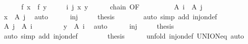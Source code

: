 \begin{isabellebody}
\ \ \ \ \ {\isacharasterisk}{\kern0pt}{\isacharasterisk}{\kern0pt}{\isacharasterisk}{\kern0pt}{\isacharcolon}{\kern0pt}\ {\isachardoublequoteopen}f\ x\ {\isacharequal}{\kern0pt}\ f\ y{\isachardoublequoteclose}\isanewline
\ \ \ \ \ i\ j\ x\ y\isanewline
\ \ \ \ \isamarkupfalse%
\ chain\ {\isacharbrackleft}{\kern0pt}OF\ {\isacharasterisk}{\kern0pt}{\isacharbrackright}{\kern0pt}\isanewline
\ \ \isamarkupfalse%
\isanewline
\ \ \ \ \isamarkupfalse%
\ {\isachardoublequoteopen}A\ i\ {\isasymle}\ A\ j{\isachardoublequoteclose}\isanewline
\ \ \ \ \isamarkupfalse%
\ {\isacharasterisk}{\kern0pt}{\isacharasterisk}{\kern0pt}\ \isamarkupfalse%
\ {\isachardoublequoteopen}x\ {\isasymin}\ A\ j{\isachardoublequoteclose}\ \isamarkupfalse%
\ auto\isanewline
\ \ \ \ \isamarkupfalse%
\ inj\ {\isacharasterisk}{\kern0pt}\ {\isacharasterisk}{\kern0pt}{\isacharasterisk}{\kern0pt}\ {\isacharasterisk}{\kern0pt}{\isacharasterisk}{\kern0pt}{\isacharasterisk}{\kern0pt}\ \isamarkupfalse%
\ {\isacharquery}{\kern0pt}thesis\isanewline
\ \ \ \ \ \ \isamarkupfalse%
\ {\isacharparenleft}{\kern0pt}auto\ simp\ add{\isacharcolon}{\kern0pt}\ inj{\isacharunderscore}{\kern0pt}on{\isacharunderscore}{\kern0pt}def{\isacharparenright}{\kern0pt}\isanewline
\ \ \isamarkupfalse%
\isanewline
\ \ \ \ \isamarkupfalse%
\ {\isachardoublequoteopen}A\ j\ {\isasymle}\ A\ i{\isachardoublequoteclose}\isanewline
\ \ \ \ \isamarkupfalse%
\ {\isacharasterisk}{\kern0pt}{\isacharasterisk}{\kern0pt}\ \isamarkupfalse%
\ {\isachardoublequoteopen}y\ {\isasymin}\ A\ i{\isachardoublequoteclose}\ \isamarkupfalse%
\ auto\isanewline
\ \ \ \ \isamarkupfalse%
\ inj\ {\isacharasterisk}{\kern0pt}\ {\isacharasterisk}{\kern0pt}{\isacharasterisk}{\kern0pt}\ {\isacharasterisk}{\kern0pt}{\isacharasterisk}{\kern0pt}{\isacharasterisk}{\kern0pt}\ \isamarkupfalse%
\ {\isacharquery}{\kern0pt}thesis\isanewline
\ \ \ \ \ \ \isamarkupfalse%
\ {\isacharparenleft}{\kern0pt}auto\ simp\ add{\isacharcolon}{\kern0pt}\ inj{\isacharunderscore}{\kern0pt}on{\isacharunderscore}{\kern0pt}def{\isacharparenright}{\kern0pt}\isanewline
\ \ \isamarkupfalse%
\isanewline
\ \ \isamarkupfalse%
\ \isamarkupfalse%
\ {\isacharquery}{\kern0pt}thesis\isanewline
\ \ \ \ \isamarkupfalse%
\ {\isacharparenleft}{\kern0pt}unfold\ inj{\isacharunderscore}{\kern0pt}on{\isacharunderscore}{\kern0pt}def\ UNION{\isacharunderscore}{\kern0pt}eq{\isacharparenright}{\kern0pt}\ auto\isanewline

\end{isabellebody}
